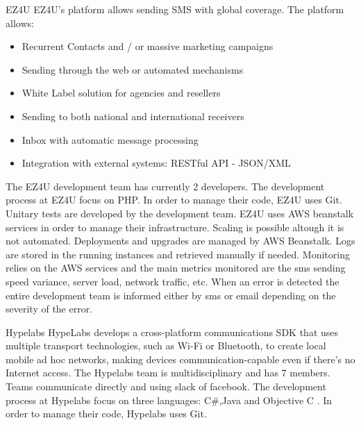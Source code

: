    \begin{companyreport}{EZ4U}
      \product
      EZ4U's platform allows sending SMS with global coverage.
      The platform allows:
      \begin{itemize}
        \item Recurrent Contacts and / or massive marketing campaigns
        \item Sending through the web or automated mechanisms
        \item White Label solution for agencies and resellers
        \item Sending to both national and international receivers
        \item Inbox with automatic message processing
        \item Integration with external systems: RESTful API - JSON/XML
      \end{itemize}
      \teams
      The EZ4U development team has currently 2 developers.
      \development
      The development process at EZ4U focus on PHP. In order to manage their code, EZ4U uses Git. \\
      Unitary tests are developed by the development team.
      \operations
      EZ4U uses AWS beanstalk services in order to manage their infrastructure. Scaling is possible altough it is not automated.
      Deployments and upgrades are managed by AWS Beanstalk.
      Logs are stored in the running instances and retrieved manually if needed.
      Monitoring relies on the AWS services and the main metrics monitored are the sms sending speed variance, server load, network traffic, etc.
      When an error is detected the entire development team is informed either by sms or email depending on the severity of the error.
      \reportend
    \end{companyreport}

    \begin{companyreport}{Hypelabs}
      \product
      HypeLabs develops a cross-platform communications SDK that uses multiple transport technologies, such as Wi-Fi or Bluetooth, to create local mobile ad hoc networks, making devices communication-capable even if there's no Internet access.
      \teams
      The Hypelabs team is multidisciplinary and has 7 members. Teams communicate directly and using slack of facebook.
      \development
      The development process at Hypelabs focus on three languages: C\#,Java and Objective C . In order to manage their code, Hypelabs uses Git.
      \reportend
    \end{companyreport}

